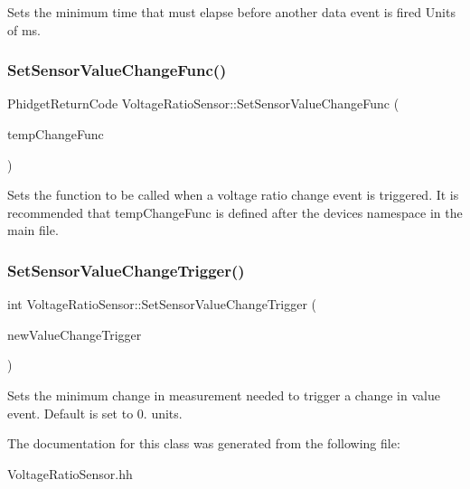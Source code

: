 Sets the minimum time that must elapse before another data event is fired Units of ms.\mbox{\label{classVoltageRatioSensor_ad6e2ac41c22ab8a9bafe95f68910d950}} 
\subsubsection{\texorpdfstring{Set\+Sensor\+Value\+Change\+Func()}{SetSensorValueChangeFunc()}}
{\footnotesize\ttfamily Phidget\+Return\+Code Voltage\+Ratio\+Sensor\+::\+Set\+Sensor\+Value\+Change\+Func (\begin{DoxyParamCaption}\item[{Phidget\+Voltage\+Ratio\+Input\+\_\+\+On\+Sensor\+Change\+Callback}]{temp\+Change\+Func }\end{DoxyParamCaption})\hspace{0.3cm}{\ttfamily [inline]}}

Sets the function to be called when a voltage ratio change event is triggered. It is recommended that temp\+Change\+Func is defined after the devices namespace in the main file.\mbox{\label{classVoltageRatioSensor_a99a4c1c3385ad27b76da87441f966641}} 
\subsubsection{\texorpdfstring{Set\+Sensor\+Value\+Change\+Trigger()}{SetSensorValueChangeTrigger()}}
{\footnotesize\ttfamily int Voltage\+Ratio\+Sensor\+::\+Set\+Sensor\+Value\+Change\+Trigger (\begin{DoxyParamCaption}\item[{double}]{new\+Value\+Change\+Trigger }\end{DoxyParamCaption})\hspace{0.3cm}{\ttfamily [inline]}}

Sets the minimum change in measurement needed to trigger a change in value event. Default is set to 0. units.

The documentation for this class was generated from the following file\+:\begin{DoxyCompactItemize}
\item 
Voltage\+Ratio\+Sensor.\+hh\end{DoxyCompactItemize}
